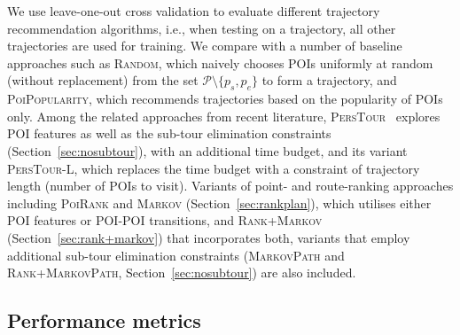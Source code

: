 We use leave-one-out cross validation to evaluate different trajectory recommendation algorithms,
i.e., when testing on a trajectory, all other trajectories are used for training.
We compare with a number of baseline approaches such as \textsc{Random}, 
which naively chooses POIs uniformly at random (without replacement) from the set $\mathcal{P} \setminus \{p_s, p_e \}$ to form a trajectory,
and \textsc{PoiPopularity}, which recommends trajectories based on the popularity of POIs only.
%
%
%
Among the related approaches from recent literature, 
\textsc{PersTour}~\cite{ijcai15} explores POI features as well as the sub-tour elimination constraints (Section~\ref{sec:nosubtour}), 
with an additional time budget, and its variant \textsc{PersTour-L}, 
which replaces the time budget with a constraint of trajectory length (number of POIs to visit).
Variants of point- and route-ranking approaches including \textsc{PoiRank} and \textsc{Markov} (Section~\ref{sec:rankplan}),
which utilises either POI features or POI-POI transitions,
and \textsc{Rank+Markov} (Section~\ref{sec:rank+markov}) that incorporates both, %
variants that employ additional sub-tour elimination constraints 
(\textsc{MarkovPath} and \textsc{Rank+MarkovPath}, Section~\ref{sec:nosubtour}) are also included.






\subsection{Performance metrics}
\label{sec:metric}
\secmoveup

